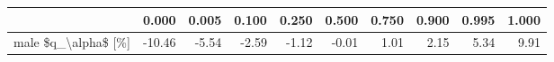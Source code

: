 \begin{tabular}{lrrrrrrrrr}
\toprule
{} &  0.000 &  0.005 &  0.100 &  0.250 &  0.500 &  0.750 &  0.900 &  0.995 &  1.000 \\
\midrule
male \$q\_\textbackslash alpha\$ [\%] & -10.46 &  -5.54 &  -2.59 &  -1.12 &  -0.01 &   1.01 &   2.15 &   5.34 &   9.91 \\
\bottomrule
\end{tabular}
